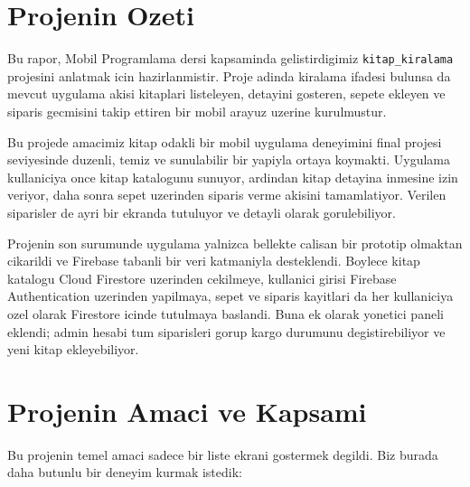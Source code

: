 \documentclass[12pt,a4paper]{article}
\begin{document}
\tableofcontents
\clearpage

\section{Projenin Ozeti}

Bu rapor, Mobil Programlama dersi kapsaminda gelistirdigimiz \verb|kitap_kiralama| projesini anlatmak icin hazirlanmistir. Proje adinda kiralama ifadesi bulunsa da mevcut uygulama akisi kitaplari listeleyen, detayini gosteren, sepete ekleyen ve siparis gecmisini takip ettiren bir mobil arayuz uzerine kurulmustur.

Bu projede amacimiz kitap odakli bir mobil uygulama deneyimini final projesi seviyesinde duzenli, temiz ve sunulabilir bir yapiyla ortaya koymakti. Uygulama kullaniciya once kitap katalogunu sunuyor, ardindan kitap detayina inmesine izin veriyor, daha sonra sepet uzerinden siparis verme akisini tamamlatiyor. Verilen siparisler de ayri bir ekranda tutuluyor ve detayli olarak gorulebiliyor.

Projenin son surumunde uygulama yalnizca bellekte calisan bir prototip olmaktan cikarildi ve Firebase tabanli bir veri katmaniyla desteklendi. Boylece kitap katalogu Cloud Firestore uzerinden cekilmeye, kullanici girisi Firebase Authentication uzerinden yapilmaya, sepet ve siparis kayitlari da her kullaniciya ozel olarak Firestore icinde tutulmaya baslandi. Buna ek olarak yonetici paneli eklendi; admin hesabi tum siparisleri gorup kargo durumunu degistirebiliyor ve yeni kitap ekleyebiliyor.

\section{Projenin Amaci ve Kapsami}

Bu projenin temel amaci sadece bir liste ekrani gostermek degildi. Biz burada daha butunlu bir deneyim kurmak istedik:
\end{document}

